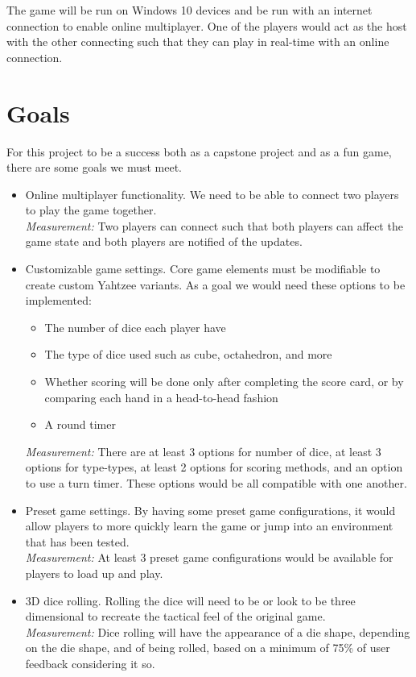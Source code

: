 \documentclass{article}
\begin{document}

The game will be run on Windows 10 devices and be run with an internet connection to enable online multiplayer. One of the players would act as the host with the other connecting such that they can play in real-time with an online connection.

\section{Goals}

For this project to be a success both as a capstone project and as a fun game, there are some goals we must meet.

\begin{itemize}
	\item Online multiplayer functionality. We need to be able to connect two players to play the game together.\\
	\textit{Measurement:} Two players can connect such that both players can affect the game state and both players are notified of the updates.
	
	\item Customizable game settings. Core game elements must be modifiable to create custom Yahtzee variants. As a goal we would need these options to be implemented:
	\begin{itemize}
        \item The number of dice each player have
        \item The type of dice used such as cube, octahedron, and more
        \item Whether scoring will be done only after completing the score card, or by comparing each hand in a head-to-head fashion
        \item A round timer
    \end{itemize}
	\textit{Measurement:} There are at least 3 options for number of dice, at least 3 options for type-types, at least 2 options for scoring methods, and an option to use a turn timer. These options would be all compatible with one another.
	
	\item Preset game settings. By having some preset game configurations, it would allow players to more quickly learn the game or jump into an environment that has been tested.\\
	\textit{Measurement:} At least 3 preset game configurations would be available for players to load up and play.
	
	\item 3D dice rolling. Rolling the dice will need to be or look to be three dimensional to recreate the tactical feel of the original game.\\
	\textit{Measurement:} Dice rolling will have the appearance of a die shape, depending on the die shape, and of being rolled, based on a minimum of 75\% of user feedback considering it so.
	
\end{itemize}
\end{document}
